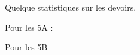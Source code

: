 
Quelque statistiques sur les devoirs.

\vfill

Pour les 5A :


\begin{center}
   
\end{center}

\vfill

Pour les 5B

\begin{center}
   
\end{center}

%   

